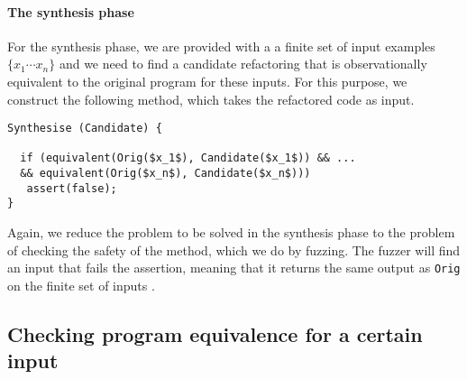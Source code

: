 \documentclass[runningheads,a4paper]{llncs}
\begin{document}
\paragraph{The synthesis phase} For the synthesis phase, we are provided with a
a finite set of input examples $\{x_1 \cdots x_n\}$ and we need to find a candidate refactoring
that is observationally equivalent to the original program for these inputs.
For this purpose, we construct the following  method, which
takes the refactored code  as input.

\begin{lstlisting}[mathescape=true,showstringspaces=false]
Synthesise (Candidate) {

  if (equivalent(Orig($x_1$), Candidate($x_1$)) && ...
  && equivalent(Orig($x_n$), Candidate($x_n$)))
   assert(false);
}
\end{lstlisting}

Again, we reduce the problem to be solved in the synthesis phase to
the problem of checking the safety of the  method,
which we do by fuzzing.
The fuzzer will find an input  that fails the assertion,
meaning that it returns the same output as \texttt{Orig}
on the finite set of inputs .





\subsection{Checking program equivalence for a certain input}\label{sec:equiv}
\end{document}
